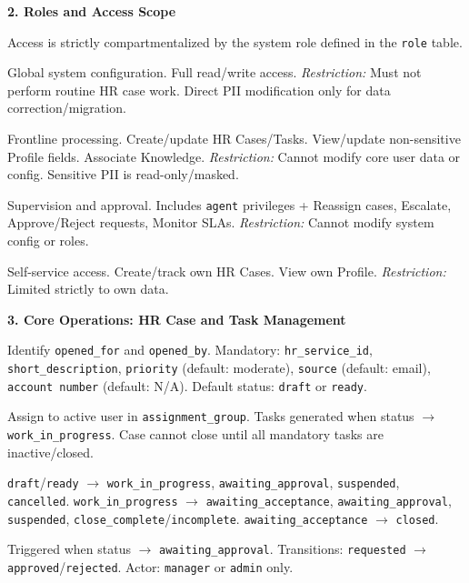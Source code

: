 \begin{taskbox}
\textbf{2. Roles and Access Scope}

Access is strictly compartmentalized by the system role defined in the \texttt{role} table.

\begin{description}
    \setlength\itemsep{0.2em}
    \item[Administrator (admin):] Global system configuration. Full read/write access. \textit{Restriction:} Must not perform routine HR case work. Direct PII modification only for data correction/migration.
    \item[HR Specialist (agent):] Frontline processing. Create/update HR Cases/Tasks. View/update non-sensitive Profile fields. Associate Knowledge. \textit{Restriction:} Cannot modify core user data or config. Sensitive PII is read-only/masked.
    \item[HR Manager (manager):] Supervision and approval. Includes \texttt{agent} privileges + Reassign cases, Escalate, Approve/Reject requests, Monitor SLAs. \textit{Restriction:} Cannot modify system config or roles.
    \item[Employee (employee):] Self-service access. Create/track own HR Cases. View own Profile. \textit{Restriction:} Limited strictly to own data.
\end{description}

\textbf{3. Core Operations: HR Case and Task Management}

\begin{description}
    \setlength\itemsep{0.2em}
    \item[Registering an HR Case:] Identify \texttt{opened\_for} and \texttt{opened\_by}. Mandatory: \texttt{hr\_service\_id}, \texttt{short\_description}, \texttt{priority} (default: moderate), \texttt{source} (default: email), \texttt{account number} (default: N/A). Default status: \texttt{draft} or \texttt{ready}.
    \item[Case Assignment and Fulfillment:] Assign to active user in \texttt{assignment\_group}. Tasks generated when status $\to$ \texttt{work\_in\_progress}. Case cannot close until all mandatory tasks are inactive/closed.
    \item[Case Lifecycle:] \texttt{draft}/\texttt{ready} $\to$ \texttt{work\_in\_progress}, \texttt{awaiting\_approval}, \texttt{suspended}, \texttt{cancelled}. \texttt{work\_in\_progress} $\to$ \texttt{awaiting\_acceptance}, \texttt{awaiting\_approval}, \texttt{suspended}, \texttt{close\_complete}/\texttt{incomplete}. \texttt{awaiting\_acceptance} $\to$ \texttt{closed}.
    \item[Approvals:] Triggered when status $\to$ \texttt{awaiting\_approval}. Transitions: \texttt{requested} $\to$ \texttt{approved}/\texttt{rejected}. Actor: \texttt{manager} or \texttt{admin} only.
\end{description}


\end{taskbox}
